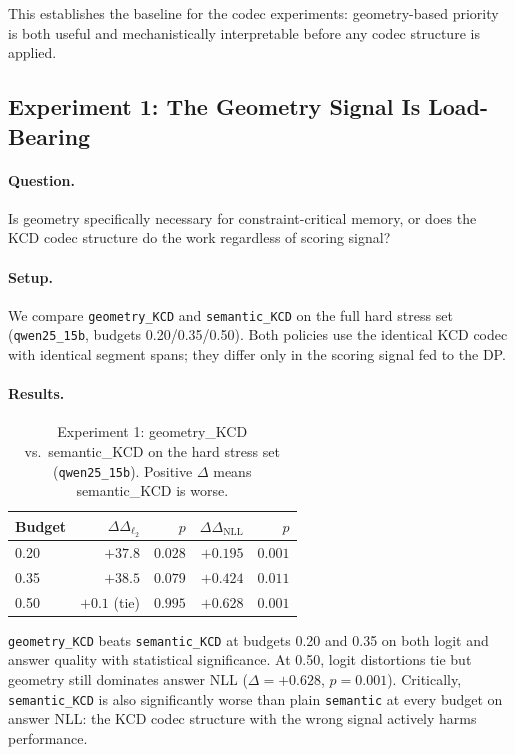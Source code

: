 \documentclass[conference]{IEEEtran}
\newcommand{\Logit}{\Delta_{\ell_2}}
\newcommand{\NLL}{\Delta_{\mathrm{NLL}}}
\begin{document}
This establishes the baseline for the codec experiments: geometry-based
priority is both useful and mechanistically interpretable before any codec
structure is applied.

\subsection{Experiment 1: The Geometry Signal Is Load-Bearing}
\label{sec:exp1}

\paragraph{Question.} Is geometry specifically necessary for constraint-critical
memory, or does the KCD codec structure do the work regardless of scoring signal?

\paragraph{Setup.} We compare \texttt{geometry\_KCD} and \texttt{semantic\_KCD}
on the full hard stress set (\texttt{qwen25\_15b}, budgets 0.20/0.35/0.50).
Both policies use the identical KCD codec with identical segment spans; they
differ only in the scoring signal fed to the DP.

\paragraph{Results.}

\begin{table}[t]
  \centering
  \caption{Experiment 1: geometry\_KCD vs.\ semantic\_KCD on the hard stress set
  (\texttt{qwen25\_15b}). Positive $\Delta$ means semantic\_KCD is worse.}
  \label{tab:exp1}
  \begin{tabular}{lrrrr}
    \toprule
    Budget & $\Delta\Logit$ & $p$ & $\Delta\NLL$ & $p$ \\
    \midrule
    0.20 & $+37.8$ & $0.028$ & $+0.195$ & $0.001$ \\
    0.35 & $+38.5$ & $0.079$ & $+0.424$ & $0.011$ \\
    0.50 & $+0.1$ (tie) & $0.995$ & $+0.628$ & $0.001$ \\
    \bottomrule
  \end{tabular}
\end{table}

\texttt{geometry\_KCD} beats \texttt{semantic\_KCD} at budgets 0.20 and 0.35
on both logit and answer quality with statistical significance. At 0.50, logit
distortions tie but geometry still dominates answer NLL ($\Delta{=}+0.628$,
$p{=}0.001$). Critically, \texttt{semantic\_KCD} is also significantly worse
than plain \texttt{semantic} at every budget on answer NLL: the KCD codec
structure with the wrong signal actively harms performance.
\end{document}
